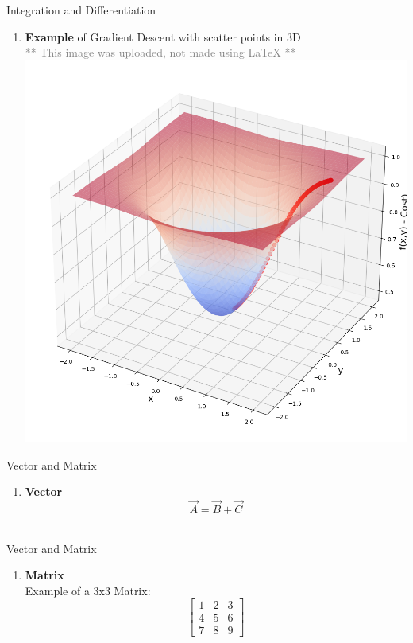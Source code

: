 \documentclass[12pt]{beamer}
\begin{document}
\begin{frame}{Integration and Differentiation}
\begin {enumerate}[3]
\item \textbf{Example} of Gradient Descent with scatter points in 3D 
    \\
    \textcolor{gray}{** This image was uploaded, not made using LaTeX **}
    \centering
    \includegraphics[scale=0.3]{download.png}
\end {enumerate}
\end{frame}
\begin{frame}{Vector and Matrix}
\begin {enumerate}
 \item \textbf{Vector}
 \\ $$\vec{A}=\vec{B} + \vec{C}$$
 \\
\end {enumerate}
\end{frame}
\begin{frame}{Vector and Matrix}
\begin {enumerate}[2]
\item \textbf{Matrix}
\\ Example of a 3x3 Matrix:
$$\begin{bmatrix}
    1&2&3
    \\4&5&6
    \\7&8&9
\end{bmatrix}$$
\\
\end {enumerate}
\end{frame}
\end{document}
